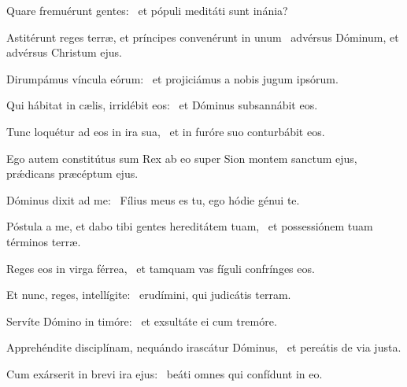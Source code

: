 \item Quare fremuérunt gentes:~\psstar{} et pópuli meditáti sunt inánia?

\item Astitérunt reges terræ, et príncipes convenérunt in unum~\psstar{} advérsus Dóminum, et advérsus Christum ejus.

\item Dirumpámus víncula eórum:~\psstar{} et projiciámus a nobis jugum ipsórum.

\item Qui hábitat in cælis, irridébit eos:~\psstar{} et Dóminus subsannábit eos.

\item Tunc loquétur ad eos in ira sua,~\psstar{} et in furóre suo conturbábit eos.

\item Ego autem constitútus sum Rex ab eo super Sion montem sanctum ejus,~\psstar{} prǽdicans præcéptum ejus.

\item Dóminus dixit ad me:~\psstar{} Fílius meus es tu, ego hódie génui te.

\item Póstula a me, et dabo tibi gentes hereditátem tuam,~\psstar{} et possessiónem tuam términos terræ.

\item Reges eos in virga férrea,~\psstar{} et tamquam vas fíguli confrínges eos.

\item Et nunc, reges, intellígite:~\psstar{} erudímini, qui judicátis terram.

\item Servíte Dómino in timóre:~\psstar{} et exsultáte ei cum tremóre.

\item Apprehéndite disciplínam, nequándo irascátur Dóminus,~\psstar{} et pereátis de via justa.

\item Cum exárserit in brevi ira ejus:~\psstar{} beáti omnes qui confídunt in eo.
